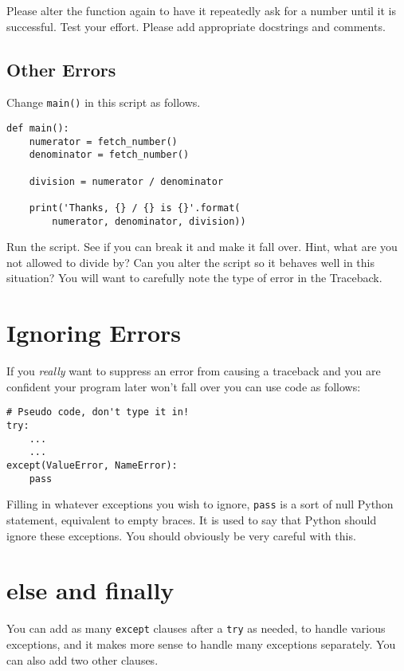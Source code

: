 \documentclass[12pt,oneside]{cttutorial}
\begin{document}
Please alter the function again to have it repeatedly ask for a number until it is successful. Test your effort. Please add appropriate docstrings and comments.

\subsection{Other Errors}

Change \lstinline!main()! in this script as follows.

\begin{lstlisting}
def main():
    numerator = fetch_number()
    denominator = fetch_number()

    division = numerator / denominator

    print('Thanks, {} / {} is {}'.format(
        numerator, denominator, division))
\end{lstlisting}

Run the script. See if you can break it and make it fall over. Hint, what are you not allowed to divide by? Can you alter the script so it behaves well in this situation? You will want to carefully note the type of error in the Traceback.

\section{Ignoring Errors}

If you \emph{really} want to suppress an error from causing a traceback and you are confident your program later won't fall over you can use code as follows:


\begin{lstlisting}
# Pseudo code, don't type it in!
try:
    ...    
    ...
except(ValueError, NameError):
    pass
\end{lstlisting}

Filling in whatever exceptions you wish to ignore, \lstinline!pass! is a sort of null Python statement, equivalent to empty braces. It is used to say that Python should ignore these exceptions. You should obviously be very careful with this.

\section{else and finally}

You can add as many \lstinline!except! clauses after a \lstinline!try! as needed, to handle various exceptions, and it makes more sense to handle many exceptions separately. You can also add two other clauses.
\end{document}
